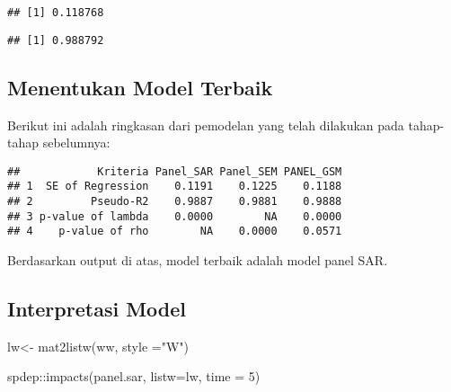 \documentclass[
]{book}
\newenvironment{Shaded}{\begin{snugshade}}{\end{snugshade}}
\newcommand{\AttributeTok}[1]{\textcolor[rgb]{0.77,0.63,0.00}{#1}}
\newcommand{\DecValTok}[1]{\textcolor[rgb]{0.00,0.00,0.81}{#1}}
\newcommand{\DocumentationTok}[1]{\textcolor[rgb]{0.56,0.35,0.01}{\textbf{\textit{#1}}}}
\newcommand{\FunctionTok}[1]{\textcolor[rgb]{0.00,0.00,0.00}{#1}}
\newcommand{\NormalTok}[1]{#1}
\newcommand{\OtherTok}[1]{\textcolor[rgb]{0.56,0.35,0.01}{#1}}
\newcommand{\SpecialCharTok}[1]{\textcolor[rgb]{0.00,0.00,0.00}{#1}}
\newcommand{\StringTok}[1]{\textcolor[rgb]{0.31,0.60,0.02}{#1}}
\begin{document}
\begin{verbatim}
## [1] 0.118768
\end{verbatim}

\begin{Shaded}
\end{Shaded}

\begin{verbatim}
## [1] 0.988792
\end{verbatim}

\hypertarget{menentukan-model-terbaik-1}{%
\subsection{Menentukan Model Terbaik}\label{menentukan-model-terbaik-1}}

Berikut ini adalah ringkasan dari pemodelan yang telah dilakukan pada tahap-tahap sebelumnya:

\begin{verbatim}
##            Kriteria Panel_SAR Panel_SEM PANEL_GSM
## 1  SE of Regression    0.1191    0.1225    0.1188
## 2         Pseudo-R2    0.9887    0.9881    0.9888
## 3 p-value of lambda    0.0000        NA    0.0000
## 4    p-value of rho        NA    0.0000    0.0571
\end{verbatim}

Berdasarkan output di atas, model terbaik adalah model panel SAR.

\hypertarget{interpretasi-model}{%
\subsection{Interpretasi Model}\label{interpretasi-model}}

\begin{Shaded}
\begin{Highlighting}[]
\NormalTok{lw}\OtherTok{\textless{}{-}} \FunctionTok{mat2listw}\NormalTok{(ww, }\AttributeTok{style =}\StringTok{"W"}\NormalTok{)}

\NormalTok{spdep}\SpecialCharTok{::}\FunctionTok{impacts}\NormalTok{(panel.sar, }\AttributeTok{listw=}\NormalTok{lw, }\AttributeTok{time =} \DecValTok{5}\NormalTok{)}
\end{Highlighting}
\end{Shaded}
\end{document}
